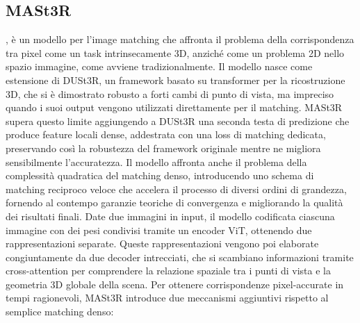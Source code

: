 \subsection{MASt3R}
, è un modello per l'image matching che affronta il problema della corrispondenza tra pixel come un task intrinsecamente 3D, anziché come un problema 2D nello spazio immagine, come avviene tradizionalmente. Il modello nasce come estensione di DUSt3R, un framework basato su transformer per la ricostruzione 3D, che si è dimostrato robusto a forti cambi di punto di vista, ma impreciso quando i suoi output vengono utilizzati direttamente per il matching. MASt3R supera questo limite aggiungendo a DUSt3R una seconda testa di predizione che produce feature locali dense, addestrata con una loss di matching dedicata, preservando così la robustezza del framework originale mentre ne migliora sensibilmente l'accuratezza. Il modello affronta anche il problema della complessità quadratica del matching denso, introducendo uno schema di matching reciproco veloce che accelera il processo di diversi ordini di grandezza, fornendo al contempo garanzie teoriche di convergenza e migliorando la qualità dei risultati finali.
Date due immagini in input, il modello codificata ciascuna immagine con dei pesi condivisi tramite un encoder ViT, ottenendo due rappresentazioni separate. Queste rappresentazioni vengono poi elaborate congiuntamente da due decoder intrecciati, che si scambiano informazioni tramite cross-attention per comprendere la relazione spaziale tra i punti di vista e la geometria 3D globale della scena.
Per ottenere corrispondenze pixel-accurate in tempi ragionevoli, MASt3R introduce due meccanismi aggiuntivi rispetto al semplice matching denso:

